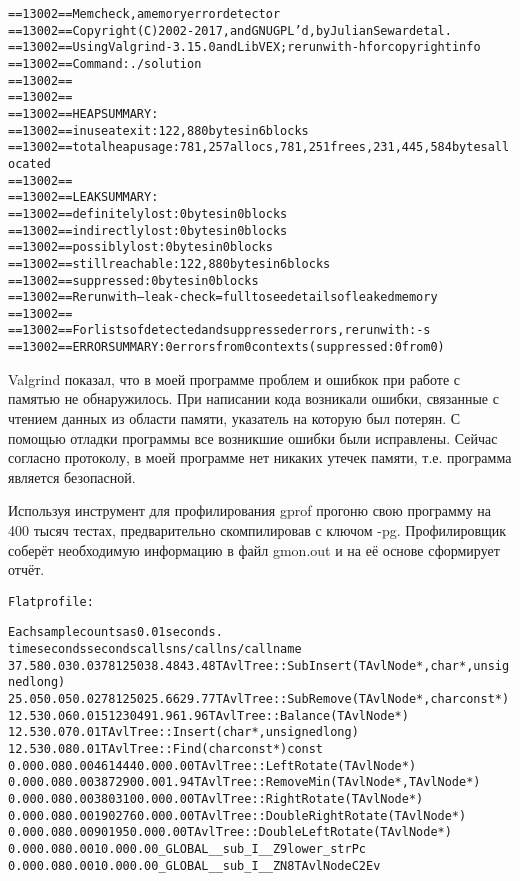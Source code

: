 \begin{alltt}
	==13002== Memcheck, a memory error detector
	==13002== Copyright (C) 2002-2017, and GNU GPL'd, by Julian Seward et al.
	==13002== Using Valgrind-3.15.0 and LibVEX; rerun with -h for copyright info
	==13002== Command: ./solution
	==13002== 
	==13002== 
	==13002== HEAP SUMMARY:
	==13002==     in use at exit: 122,880 bytes in 6 blocks
	==13002==   total heap usage: 781,257 allocs, 781,251 frees, 231,445,584 bytes allocated
	==13002== 
	==13002== LEAK SUMMARY:
	==13002==    definitely lost: 0 bytes in 0 blocks
	==13002==    indirectly lost: 0 bytes in 0 blocks
	==13002==      possibly lost: 0 bytes in 0 blocks
	==13002==    still reachable: 122,880 bytes in 6 blocks
	==13002==         suppressed: 0 bytes in 0 blocks
	==13002== Rerun with --leak-check=full to see details of leaked memory
	==13002== 
	==13002== For lists of detected and suppressed errors, rerun with: -s
	==13002== ERROR SUMMARY: 0 errors from 0 contexts (suppressed: 0 from 0)
\end{alltt}

Valgrind показал, что в моей программе проблем и ошибкок при работе с памятью
не обнаружилось. При написании кода возникали ошибки, связанные с чтением данных из области памяти, указатель на которую был потерян. С помощью отладки
программы все возникшие ошибки были исправлены. Сейчас согласно протоколу, в
моей программе нет никаких утечек памяти, т.е. программа является безопасной.


Используя инструмент для профилирования gprof прогоню свою программу на 400
тысяч тестах, предварительно скомпилировав с ключом -pg. Профилировщик соберёт необходимую информацию в файл gmon.out и на её основе сформирует отчёт.

\newpage

\begin{alltt}
	Flat profile:

	Each sample counts as 0.01 seconds.
	  %   cumulative   self              self     total           
	 time   seconds   seconds    calls  ns/call  ns/call  name    
	 37.58      0.03     0.03   781250    38.48    43.48  TAvlTree::SubInsert(TAvlNode*, char*, unsigned long)
	 25.05      0.05     0.02   781250    25.66    29.77  TAvlTree::SubRemove(TAvlNode*, char const*)
	 12.53      0.06     0.01  5123049     1.96     1.96  TAvlTree::Balance(TAvlNode*)
	 12.53      0.07     0.01                             TAvlTree::Insert(char*, unsigned long)
	 12.53      0.08     0.01                             TAvlTree::Find(char const*) const
	  0.00      0.08     0.00   461444     0.00     0.00  TAvlTree::LeftRotate(TAvlNode*)
	  0.00      0.08     0.00   387290     0.00     1.94  TAvlTree::RemoveMin(TAvlNode*, TAvlNode*)
	  0.00      0.08     0.00   380310     0.00     0.00  TAvlTree::RightRotate(TAvlNode*)
	  0.00      0.08     0.00   190276     0.00     0.00  TAvlTree::DoubleRightRotate(TAvlNode*)
	  0.00      0.08     0.00    90195     0.00     0.00  TAvlTree::DoubleLeftRotate(TAvlNode*)
	  0.00      0.08     0.00        1     0.00     0.00  _GLOBAL__sub_I__Z9lower_strPc
	  0.00      0.08     0.00        1     0.00     0.00  _GLOBAL__sub_I__ZN8TAvlNodeC2Ev
\end{alltt}

